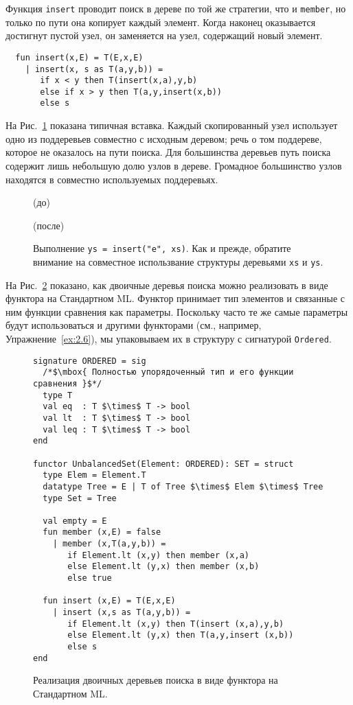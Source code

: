 Функция \lstinline!insert! проводит поиск в дереве по той же стратегии,
что и \lstinline!member!, но только по пути она копирует каждый
элемент. Когда наконец оказывается достигнут пустой узел, он
заменяется на узел, содержащий новый элемент.
\begin{lstlisting}
  fun insert(x,E) = T(E,x,E)
    | insert(x, s as T(a,y,b)) =
       if x < y then T(insert(x,a),y,b)
       else if x > y then T(a,y,insert(x,b))
       else s
\end{lstlisting}
На Рис.~\ref{fig:2.8} показана типичная вставка. Каждый скопированный
узел использует одно из поддеревьев совместно с исходным деревом; речь о том поддереве,
которое не оказалось на пути поиска. Для большинства деревьев путь
поиска содержит лишь небольшую долю узлов в дереве. Громадное
большинство узлов находятся в совместно используемых поддеревьях.

\begin{figure}[h]
  \centering
	\par
  (до)\par
	\vspace{0.5cm}
	\par
  (после)\par
	\vspace{0.5cm}
  \caption{Выполнение \lstinline!ys = insert("e", xs)!. Как и прежде,
    обратите внимание на совместное использвание структуры деревьями \lstinline!xs! и \lstinline!ys!.}
  \label{fig:2.8}
\end{figure}

На Рис.~\ref{fig:2.9} показано, как двоичные деревья поиска можно
реализовать в виде функтора на Стандартном ML. Функтор принимает тип
элементов и связанные с ним функции сравнения как параметры. Поскольку
часто те же самые параметры будут использоваться и другими функторами
(см., например, Упражнение~\ref{ex:2.6}), мы упаковываем их в
структуру с сигнатурой \lstinline!Ordered!.

\begin{figure}
\begin{lstlisting}
signature ORDERED = sig
  /*$\mbox{ Полностью упорядоченный тип и его функции сравнения }$*/
  type T
  val eq  : T $\times$ T -> bool
  val lt  : T $\times$ T -> bool
  val leq : T $\times$ T -> bool
end

functor UnbalancedSet(Element: ORDERED): SET = struct
  type Elem = Element.T
  datatype Tree = E | T of Tree $\times$ Elem $\times$ Tree
  type Set = Tree

  val empty = E
  fun member (x,E) = false
    | member (x,T(a,y,b)) =
       if Element.lt (x,y) then member (x,a)
       else Element.lt (y,x) then member (x,b)
       else true

  fun insert (x,E) = T(E,x,E)
    | insert (x,s as T(a,y,b)) =
       if Element.lt (x,y) then T(insert (x,a),y,b)
       else Element.lt (y,x) then T(a,y,insert (x,b))
       else s
end
\end{lstlisting}
  \caption{Реализация двоичных деревьев поиска в виде функтора на Стандартном ML.}
  \label{fig:2.9}
\end{figure}

